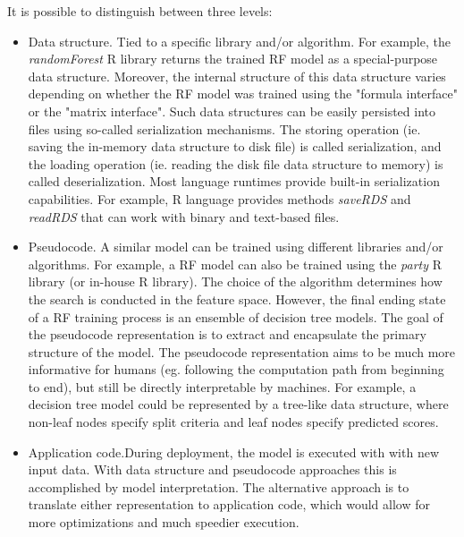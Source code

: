 \documentclass[12pt,letterpaper]{article}
\begin{document}
It is possible to distinguish between three levels:
\begin{itemize}
  \item Data structure. Tied to a specific library and/or algorithm.
  For example, the \textit{randomForest} R library returns the trained
  RF model as a special-purpose data structure. Moreover, the internal
  structure of this data structure varies depending on whether the RF
  model was trained using the "formula interface" or the "matrix interface".
  Such data structures can be easily persisted into files using so-called
  serialization mechanisms. The storing operation (ie. saving the in-memory
  data structure to disk file) is called serialization, and the loading
  operation (ie. reading the disk file data structure to memory) is called
  deserialization. Most language runtimes provide built-in serialization
  capabilities. For example, R language provides methods \textit{saveRDS}
  and \textit{readRDS} that can work with binary and text-based files.
  \item Pseudocode. A similar model can be trained using different libraries
  and/or algorithms. For example, a RF model can also be trained using
  the \textit{party} R library (or in-house R library). The choice of the
  algorithm determines how the search is conducted in the feature space. 
  However, the final ending state of a RF training process is an ensemble
  of decision tree models.
  The goal of the pseudocode representation is to extract and encapsulate
  the primary structure of the model. The pseudocode representation aims 
  to be much more informative for humans (eg. following the computation
  path from beginning to end), but still be directly interpretable by 
  machines. For example, a decision tree model could be represented by
  a tree-like data structure, where non-leaf nodes specify split criteria 
  and leaf nodes specify predicted scores.
  \item Application code.During deployment, the model is executed with
  with new input data. With data structure and pseudocode approaches this 
  is accomplished by model interpretation. The alternative approach is to
  translate either representation to application code, which would allow
  for more optimizations and much speedier execution. 
\end{itemize}
\end{document}
